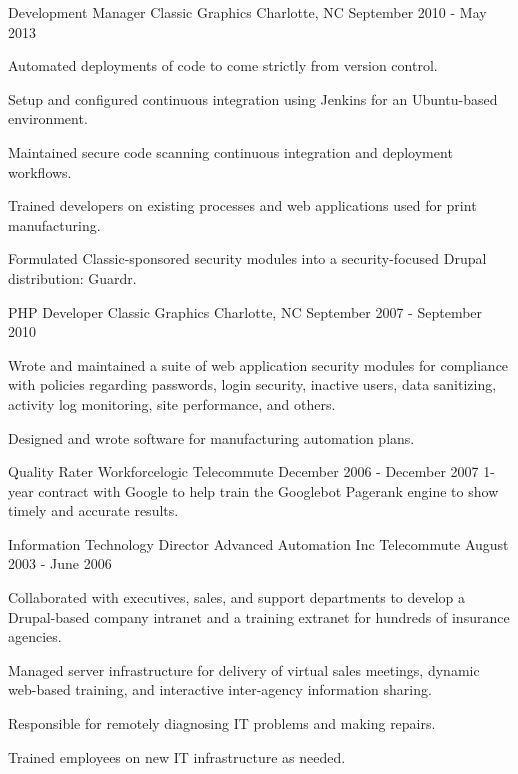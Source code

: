 \begin{cventries}

\cventry
{Development Manager}
{Classic Graphics} %
{Charlotte, NC} %
{September 2010 - May 2013} %
{
\begin{cvitems}
\item[]
Automated deployments of code to come strictly from version control.
\item {Setup and configured continuous integration using Jenkins for an Ubuntu-based environment.}
\item {Maintained secure code scanning continuous integration and deployment workflows.}
\item {Trained developers on existing processes and web applications used for print manufacturing.}
\item {Formulated Classic-sponsored security modules into a security-focused Drupal distribution: Guardr.}
\end{cvitems}
}


\cventry
{PHP Developer}
{Classic Graphics} %
{Charlotte, NC} %
{September 2007 - September 2010} %
{
\begin{cvitems}
\item[]
\item {Wrote and maintained a suite of web application security modules for compliance with policies regarding passwords, login security, inactive users, data sanitizing, activity log monitoring, site performance, and others.}
\item {Designed and wrote software for manufacturing automation plans.}
\end{cvitems}
}

\cventry
{Quality Rater}
{Workforcelogic}
{Telecommute}
{December 2006 - December 2007} %
{ %
1-year contract with Google to help train the Googlebot Pagerank engine to show timely and accurate results.
}


\cventry
{Information Technology Director}
{Advanced Automation Inc}
{Telecommute}
{August 2003 - June 2006} %
{ %
Collaborated with executives, sales, and support departments to develop a Drupal-based company intranet and a training extranet for hundreds of insurance agencies.
\begin{cvitems}
\item[]
\item {Managed server infrastructure for delivery of virtual sales meetings, dynamic web-based training, and interactive inter-agency information sharing.}
\item {Responsible for remotely diagnosing IT problems and making repairs. }
\item {Trained employees on new IT infrastructure as needed. }
\end{cvitems}
}


\end{cventries}
